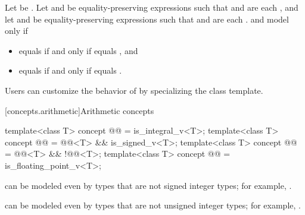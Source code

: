 \begin{itemdescr}
\pnum
Let  be .
Let  and  be
equality-preserving expressions such that
 and  are each , and
let  and  be equality-preserving expressions such that
 and  are each .
 and  model 
only if
\begin{itemize}
\item {} equals  if and only if
   equals , and
\item {} equals  if and only if
   equals .
\end{itemize}

\pnum
\begin{note}
Users can customize the behavior of  by specializing the
 class template.
\end{note}

\end{itemdescr}

[concepts.arithmetic]{Arithmetic concepts}

\begin{itemdecl}
template<class T>
  concept @@ = is_integral_v<T>;
template<class T>
  concept @@ = @@<T> && is_signed_v<T>;
template<class T>
  concept @@ = @@<T> && !@@<T>;
template<class T>
  concept @@ = is_floating_point_v<T>;
\end{itemdecl}

\begin{itemdescr}
\pnum
\begin{note}
 can be modeled even by types that are
not signed integer types; for example, .
\end{note}

\pnum
\begin{note}
 can be modeled even by types that are
not unsigned integer types; for example, .
\end{note}
\end{itemdescr}

